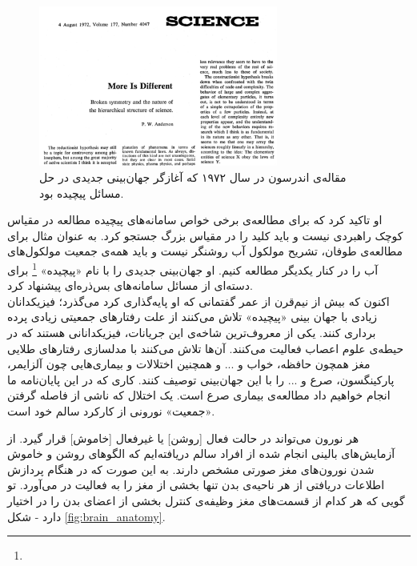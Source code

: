 \begin{figure}
	\centering
	\includegraphics[width=0.7\textwidth]{../Figures/more_is_different_anderson.png}
	\caption{مقاله‌ی اندرسون در سال ۱۹۷۲ که آغازگر جهان‌بینی جدیدی در حل مسائل پیچیده بود.}
	\label{fig:anderson}
\end{figure}


او تاکید کرد که برای مطالعه‌ی برخی خواص سامانه‌های پیچیده مطالعه در مقیاس کوچک راهبردی نیست و باید کلید را در مقیاس بزرگ جستجو کرد. به عنوان مثال برای مطالعه‌ی طوفان، تشریح مولکول آب روشنگر نیست و باید همه‌ی جمعیت مولکول‌های آب را در کنار یکدیگر مطالعه کنیم. او  جهان‌بینی جدیدی را با نام «پیچیده»
\footnote{
}
 برای دسته‌ای از مسائل سامانه‌های بس‌ذره‌ای پیشنهاد کرد.\\
 
 اکنون که بیش از نیم‌قرن از عمر گفتمانی که او پایه‌گذاری کرد می‌گذرد؛ فیزیکدانان زیادی با جهان بینی «پیچیده» تلاش می‌کنند از علت رفتارهای جمعیتی زیادی پرده برداری کنند. یکی از معروف‌ترین شاخه‌ی این جریانات، فیزیکدانانی هستند که در حیطه‌ی علوم اعصاب فعالیت می‌کنند. آن‌ها تلاش می‌کنند با مدلسازی رفتارهای طلایی مغز همچون حافظه، خواب و ... و همچنین اختلالات و بیماری‌هایی چون آلزایمر، پارکینگسون، صرع و ... را با این جهان‌بینی توصیف کنند. کاری که در این پایان‌نامه ما انجام خواهیم داد مطالعه‌ی بیماری صرع است. یک اختلال که ناشی از فاصله گرفتن «جمعیت» نورونی از کارکرد سالم خود است.

 هر نورون‌ می‌تواند در حالت فعال [روشن] یا غیرفعال [خاموش] قرار گیرد. از آزمایش‌های بالینی انجام شده از افراد سالم دریافته‌ایم که الگوهای روشن و خاموش شدن نورون‌های مغز صورتی مشخص دارند. به این صورت که در هنگام پردازش اطلاعات دریافتی از هر ناحیه‌ی بدن تنها بخشی از مغز را به فعالیت در می‌آورد. تو گویی که هر کدام از قسمت‌های مغز وظیفه‌ی کنترل بخشی از اعضای بدن را در اختیار دارد - شکل \ref{fig:brain_anatomy}. 

